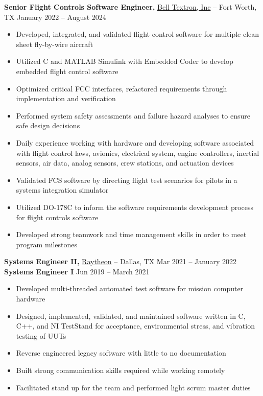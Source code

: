 \documentclass[11pt]{article}       %
\begin{document}
\textbf{Senior Flight Controls Software Engineer,} \href{https://www.bellflight.com/}{Bell Textron, Inc} -- Fort Worth, TX \hfill January 2022 -- August 2024 \\
\vspace{-9pt}
\begin{itemize}
  \item Developed, integrated, and validated flight control software for multiple clean sheet fly-by-wire aircraft
  \item Utilized C and MATLAB Simulink with Embedded Coder to develop embedded flight control software
  \item Optimized critical FCC interfaces, refactored requirements through implementation and verification
  \item Performed system safety assessments and failure hazard analyses to ensure safe design decisions
  \item Daily experience working with hardware and developing software associated with flight control laws, avionics, electrical system, engine controllers, inertial sensors, air data, analog sensors, crew stations, and actuation devices
  \item Validated FCS software by directing flight test scenarios for pilots in a systems integration simulator
  \item Utilized DO-178C to inform the software requirements development process for flight controls software
  \item Developed strong teamwork and time management skills in order to meet program milestones
\end{itemize}

\textbf{Systems Engineer II,} \href{https://www.rtx.com/}{Raytheon} -- Dallas, TX \hfill Mar 2021 -- January 2022 \\
\textbf{Systems Engineer I} \hfill Jun 2019 -- March 2021 \\
\vspace{-9pt}
\begin{itemize}
  \item Developed multi-threaded automated test software for mission computer hardware
  \item Designed, implemented, validated, and maintained software written in C, C++, and NI TestStand for acceptance, environmental stress, and vibration testing of UUTs
  \item Reverse engineered legacy software with little to no documentation
  \item Built strong communication skills required while working remotely
  \item Facilitated stand up for the team and performed light scrum master duties
\end{itemize}
\end{document}
